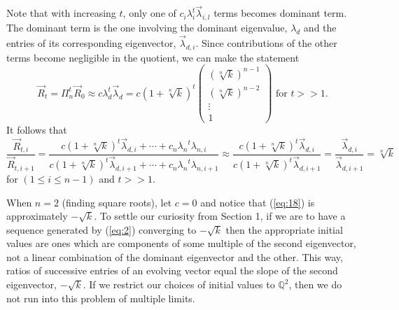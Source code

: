 \documentclass[11pt]{article}
\theoremstyle{plain}
\theoremstyle{definition}
\begin{document}
Note that with increasing $t$, only one of $c_i\lambda_i^t\vec{\lambda}_{i,l}$ terms becomes dominant term. The dominant term is the one involving the dominant eigenvalue, $\lambda_d$ and the entries of its corresponding eigenvector, $\vec{\lambda}_{d,i}$. Since contributions of the other terms become negligible in the quotient, we can make the statement
\begin{equation*}
\vec{R}_t=\Pi_n^t \vec{R}_0\approx c\lambda_d^t\vec{\lambda}_d=c(1+\sqrt[n]{k})^t\left(\begin{array}{c}
\left(\sqrt[n]{k}\right)^{n-1} \\
\left(\sqrt[n]{k}\right)^{n-2} \\
\vdots \\
1\end{array} \right)\mbox{ for } t>>1.
\end{equation*}
It follows that
\begin{equation}\label{eq:18}
\frac{\vec{R}_{t,i}}{\vec{R}_{t,i+1}}=
\frac{c(1+\sqrt[n]{k})^t\vec{\lambda}_{d,i}+\cdots+c_n{\lambda_n}^t\lambda_{n,i}}
{c(1+\sqrt[n]{k})^t\vec{\lambda}_{d,i+1}+\cdots+c_n{\lambda_n}^t\lambda_{n,i+1}}
\approx\frac{c(1+\sqrt[n]{k})^t\vec{\lambda}_{d,i}}{c(1+\sqrt[n]{k})^t\vec{\lambda}_{d,i+1}}=\frac{\vec{\lambda}_{d,i}}{\vec{\lambda}_{d,i+1}}=\sqrt[n]{k}
\end{equation}
for $(1\leq i\leq n-1)$ and $t>>1$.

When $n=2$ (finding square roots), let $c=0$ and notice that (\ref{eq:18}) is approximately $-\sqrt{k}$. To settle our curiosity from Section 1, if we are to have a sequence generated by (\ref{eq:2}) converging to $-\sqrt{k}$ then the appropriate initial values are ones which are components of some multiple of the second eigenvector, not a linear combination of the dominant eigenvector and the other. This way, ratios of successive entries of an evolving vector equal the slope of the second eigenvector, $-\sqrt{k}$. If we restrict our choices of initial values to $\mathbb{Q}^2$, then we do not run into this problem of multiple limits.
\end{document}
